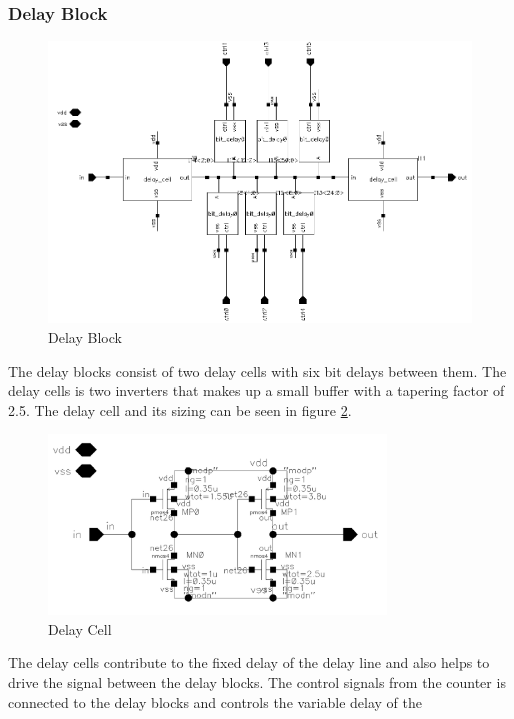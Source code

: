 \documentclass[a4paper,12pt]{article} \usepackage{graphicx}
\begin{document}
\subsubsection{Delay Block}
\begin{figure}[h]
        \centering
        \includegraphics[width=\textwidth]{../Bilder/Delay_Line/Delay_cell.png}
        \caption{Delay Block}
        \label{fig:del_bl}
\end{figure}
The delay blocks consist of two delay cells with six bit delays between
them. The delay cells is two inverters that makes up a small buffer with a
tapering factor of 2.5. The delay cell and its sizing can be seen in figure
\ref{fig:del_cell}. 
\begin{figure}[h]
        \centering
        \includegraphics[width=0.8\textwidth]{../Bilder/Delay_Line/Delay_inv.png}
        \caption{Delay Cell}
        \label{fig:del_cell}
\end{figure}
The delay cells contribute to the fixed delay of the delay line and also helps
to drive the signal between the delay blocks. The control signals from the
counter is connected to the delay blocks and controls the variable delay of the
\end{document}
